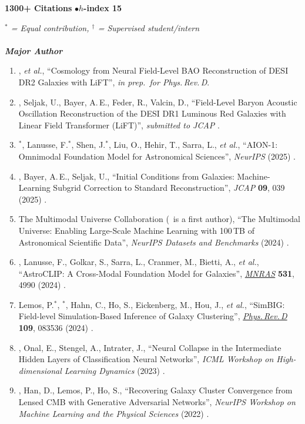 \textbf{1300+ Citations} \quad$\bullet$\quad \textbf{$h$-index 15} 

\textit{$^*$ = Equal contribution, $^\dagger$ = Supervised student/intern}\\\\
\textbf{\textit{Major Author}}
\begin{enumerate}
    \item \me, \textit{et al.}, ``Cosmology from Neural Field-Level BAO Reconstruction of DESI DR2 Galaxies with LiFT'', \textit{in prep.\ for Phys.\,Rev.\,D}.
    \item \me, Seljak, U., Bayer, A.\,E., Feder, R., Valcin, D., ``Field-Level Baryon Acoustic Oscillation Reconstruction of the DESI DR1 Luminous Red Galaxies with Linear Field Transformer (LiFT)'', \textit{submitted to JCAP} .
    \item \me$^*$, Lanusse, F.$^*$, Shen, J.$^*$, Liu, O., Hehir, T., Sarra, L., \textit{et al.}, ``AION-1: Omnimodal Foundation Model for Astronomical Sciences'', \textit{NeurIPS} (2025) .
    \item \me, Bayer, A.\,E., Seljak, U., ``Initial Conditions from Galaxies: Machine-Learning Subgrid Correction to Standard Reconstruction'', \textit{JCAP} \textbf{09}, 039 (2025) .
    \item The Multimodal Universe Collaboration (\me\ is a first author), ``The Multimodal Universe: Enabling Large-Scale Machine Learning with 100\,TB of Astronomical Scientific Data'', \textit{NeurIPS Datasets and Benchmarks} (2024) .
    \item \me, Lanusse, F., Golkar, S., Sarra, L., Cranmer, M., Bietti, A., \textit{et al.}, ``AstroCLIP: A Cross-Modal Foundation Model for Galaxies'', \href{https://doi.org/10.1093/mnras/stae1450}{\textit{MNRAS}} \textbf{531}, 4990 (2024) .
    \item Lemos, P.$^*$, \me$^*$, Hahn, C., Ho, S., Eickenberg, M., Hou, J., \textit{et al.}, ``SimBIG: Field-level Simulation-Based Inference of Galaxy Clustering'', \href{https://doi.org/10.1103/PhysRevD.109.083536}{\textit{Phys.\,Rev.\,D}} \textbf{109}, 083536 (2024) .
    \item \me, Onal, E., Stengel, A., Intrater, J., ``Neural Collapse in the Intermediate Hidden Layers of Classification Neural Networks'', \textit{ICML Workshop on High-dimensional Learning Dynamics} (2023) .
    \item \me, Han, D., Lemos, P., Ho, S., ``Recovering Galaxy Cluster Convergence from Lensed CMB with Generative Adversarial Networks'', \textit{NeurIPS Workshop on Machine Learning and the Physical Sciences} (2022) .
\end{enumerate}
